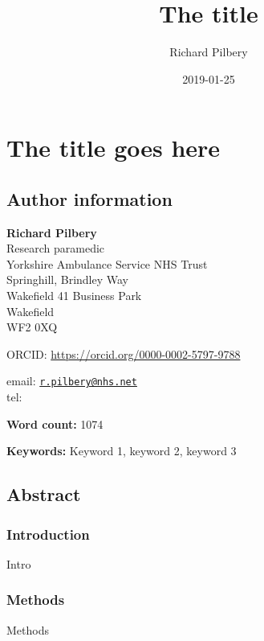 \documentclass[]{article}
\title{The title}
\author{Richard Pilbery}
\date{2019-01-25}
\begin{document}
\maketitle

{
\setcounter{tocdepth}{2}
\tableofcontents
}
\hypertarget{the-title-goes-here}{%
\section{The title goes here}\label{the-title-goes-here}}

\hypertarget{author-information}{%
\subsection{Author information}\label{author-information}}

\textbf{Richard Pilbery}\\
Research paramedic\\
Yorkshire Ambulance Service NHS Trust\\
Springhill, Brindley Way\\
Wakefield 41 Business Park\\
Wakefield\\
WF2 0XQ

ORCID: \url{https://orcid.org/0000-0002-5797-9788}

email: \href{mailto:r.pilbery@nhs.net}{\nolinkurl{r.pilbery@nhs.net}}\\
tel:

\textbf{Word count:} 1074

\textbf{Keywords:} Keyword 1, keyword 2, keyword 3

\hypertarget{abstract}{%
\subsection{Abstract}\label{abstract}}

\hypertarget{introduction}{%
\subsubsection{Introduction}\label{introduction}}

Intro

\hypertarget{methods}{%
\subsubsection{Methods}\label{methods}}

Methods
\end{document}
